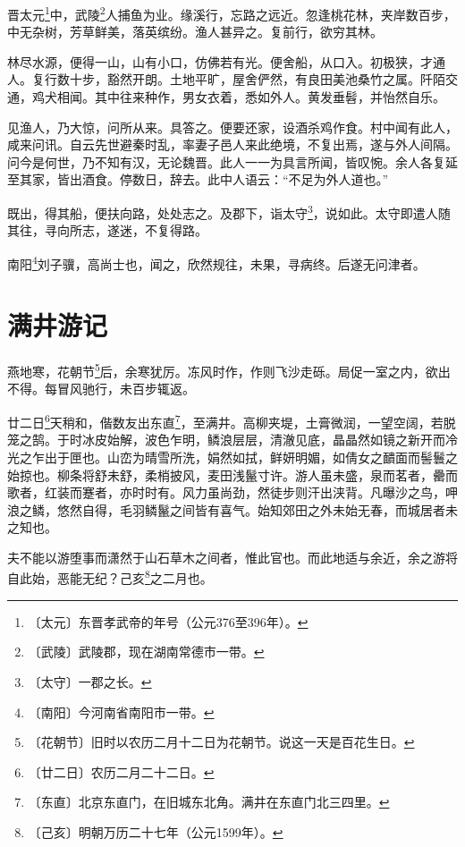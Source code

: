 \documentclass[12pt,UTF-8,openany]{ctexbook}
\begin{document}
\begin{normalsize}
    
    晋太元\footnote{〔太元〕东晋孝武帝的年号（公元376至396年）。}中，武陵\footnote{〔武陵〕武陵郡，现在湖南常德市一带。}人捕鱼为业。缘溪行，忘路之远近。忽逢桃花林，夹岸数百步，中无杂树，芳草鲜美，落英缤纷。渔人甚异之。复前行，欲穷其林。
    
    林尽水源，便得一山，山有小口，仿佛若有光。便舍船，从口入。初极狭，才通人。复行数十步，豁然开朗。土地平旷，屋舍俨然，有良田美池桑竹之属。阡陌交通，鸡犬相闻。其中往来种作，男女衣着，悉如外人。黄发垂髫，并怡然自乐。
    
    见渔人，乃大惊，问所从来。具答之。便要还家，设酒杀鸡作食。村中闻有此人，咸来问讯。自云先世避秦时乱，率妻子邑人来此绝境，不复出焉，遂与外人间隔。问今是何世，乃不知有汉，无论魏晋。此人一一为具言所闻，皆叹惋。余人各复延至其家，皆出酒食。停数日，辞去。此中人语云：“不足为外人道也。”
    
    既出，得其船，便扶向路，处处志之。及郡下，诣太守\footnote{〔太守〕一郡之长。}，说如此。太守即遣人随其往，寻向所志，遂迷，不复得路。
    
    南阳\footnote{〔南阳〕今河南省南阳市一带。}刘子骥，高尚士也，闻之，欣然规往，未果，寻病终。后遂无问津者。
\end{normalsize}



\chapter{满井游记}

\begin{normalsize}
    
    燕地寒，花朝节\footnote{〔花朝节〕旧时以农历二月十二日为花朝节。说这一天是百花生日。}后，余寒犹厉。冻风时作，作则飞沙走砾。局促一室之内，欲出不得。每冒风驰行，未百步辄返。
    
    廿二日\footnote{〔廿二日〕农历二月二十二日。}天稍和，偕数友出东直\footnote{〔东直〕北京东直门，在旧城东北角。满井在东直门北三四里。}，至满井。高柳夹堤，土膏微润，一望空阔，若脱笼之鹄。于时冰皮始解，波色乍明，鳞浪层层，清澈见底，晶晶然如镜之新开而冷光之乍出于匣也。山峦为晴雪所洗，娟然如拭，鲜妍明媚，如倩女之靧面而髻鬟之始掠也。柳条将舒未舒，柔梢披风，麦田浅鬣寸许。游人虽未盛，泉而茗者，罍而歌者，红装而蹇者，亦时时有。风力虽尚劲，然徒步则汗出浃背。凡曝沙之鸟，呷浪之鳞，悠然自得，毛羽鳞鬣之间皆有喜气。始知郊田之外未始无春，而城居者未之知也。
    
    夫不能以游堕事而潇然于山石草木之间者，惟此官也。而此地适与余近，余之游将自此始，恶能无纪？己亥\footnote{〔己亥〕明朝万历二十七年（公元1599年）。}之二月也。
\end{normalsize}
\end{document}
